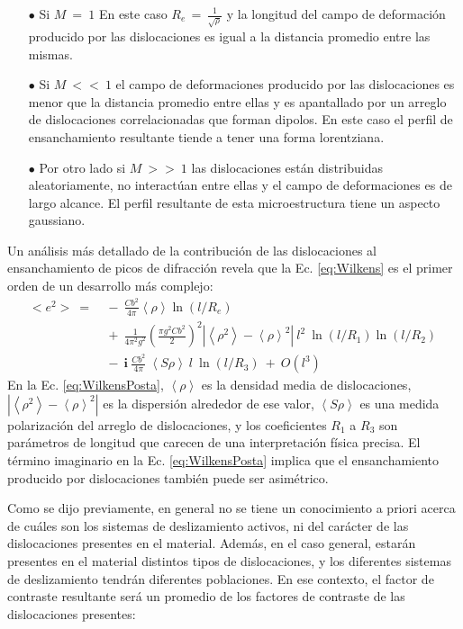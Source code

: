\begin{itemize}
  \item[$\bullet$] Si $M \ = \ 1 $ En este caso $R_e\,=\,\frac{1}{\sqrt{\rho}}$ y la longitud del campo de deformación producido por las dislocaciones es igual a la distancia promedio entre las mismas.
  \item[$\bullet$] Si $M \ << \ 1 $ el campo de deformaciones producido por las dislocaciones es menor que la distancia promedio entre ellas y es apantallado por un arreglo de dislocaciones correlacionadas que forman dipolos. En este caso el perfil de ensanchamiento resultante tiende a tener una forma lorentziana.
  \item[$\bullet$] Por otro lado si $M \ >> \ 1 $ las dislocaciones están distribuidas aleatoriamente, no interactúan entre ellas y el campo de deformaciones es de largo alcance. El perfil resultante de esta microestructura tiene un aspecto gaussiano.
\end{itemize}

Un análisis más detallado de la contribución de las dislocaciones al ensanchamiento de picos de difracción revela que la Ec. \ref{eq:Wilkens} es el primer orden de un desarrollo más complejo\cite{Groma1988}:
\begin{equation}
  \begin{split}
      <e^2> \ = & \ - \ \frac{Cb^2}{4 \pi}\left< \rho \right> \ln \left( l/R_e \right) \ \\
     & \ +  \ \frac{1}{4\pi^2g^2} \left( \frac{\pi g^2 C b^2}{2} \right)^2 |\left<\rho^2\right> - \left< \rho \right>^2| \ l^2 \ \ln(l/R_1) \ln(l/R_2) \ \\
     & \ - \ \mathbf{i} \ \frac{Cb^2}{4\pi} \ \left< S\rho \right> \ l \ \ln(l/R_3) \ + \ O(l^3)
  \end{split}
  \label{eq:WilkensPosta}
\end{equation}
\noindent
En la Ec. \ref{eq:WilkensPosta}, $\left< \rho \right>$ es la densidad media de dislocaciones, $|\left<\rho^2\right> - \left< \rho \right>^2|$ es la dispersión alrededor de ese valor, $\left< S\rho \right>$ es una medida polarización del arreglo de dislocaciones, y los coeficientes $R_1$ a $R_3$ son parámetros de longitud que carecen de una interpretación física precisa.
El término imaginario en la Ec. \ref{eq:WilkensPosta} implica que el ensanchamiento producido por dislocaciones también puede ser asimétrico.

Como se dijo previamente, en general no se tiene un conocimiento a priori acerca de cuáles son los sistemas de deslizamiento activos, ni del carácter de las dislocaciones presentes en el material. Además, en el caso general, estarán presentes en el material distintos tipos de dislocaciones, y los diferentes sistemas de deslizamiento tendrán diferentes poblaciones. En ese contexto, el factor de contraste resultante será un promedio de los factores de contraste de las dislocaciones presentes:

